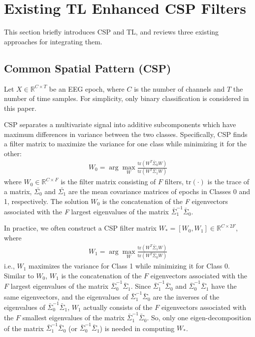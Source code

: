 \documentclass[runningheads]{llncs}
\begin{document}
\section{Existing TL Enhanced CSP Filters} \label{sect:bk}

This section briefly introduces CSP and TL, and reviews three existing approaches for integrating them.

\subsection{Common Spatial Pattern (CSP)}

Let $X\in \mathbb{R}^{C\times T}$ be an EEG epoch, where $C$ is the number of channels and $T$ the number of time samples. For simplicity, only binary classification is considered in this paper.

CSP \cite{drwuSF2018,Blankertz2008,Ramoser2000} separates a multivariate signal into additive subcomponents which have maximum differences in variance between the two classes. Specifically, CSP finds a filter matrix to maximize the variance for one class while minimizing it for the other:
\begin{align}
W_0=\arg \max_{W} \frac{\mathrm{tr}(W^T\bar{\Sigma}_0W)}{\mathrm{tr}(W^T \bar{\Sigma}_1W)} \label{1}
\end{align}
where $W_0\in \mathbb{R}^{C\times F}$ is the filter matrix consisting of $F$ filters, $\mathrm{tr}(\cdot)$ is the trace of a matrix, $\bar{\Sigma_0}$ and $ \bar{\Sigma_1}$ are the mean covariance matrices of epochs in Classes 0 and 1, respectively. The solution $W_0$ is the concatenation of the \textit{F} eigenvectors associated with the \textit{F} largest eigenvalues of the matrix $\bar{\Sigma}_1^{-1}\bar{\Sigma}_0$.

In practice, we often construct a CSP filter matrix $W_{\ast}=[W_0, W_1]\in \mathbb{R}^{C\times 2F}$, where
\begin{align}
W_1=\arg \max_W \frac{\mathrm{tr}(W^T\bar{\Sigma}_1W)}{\mathrm{tr}(W^T \bar{\Sigma}_0W)}\label{2}
\end{align}
i.e., $W_1$ maximizes the variance for Class 1 while minimizing it for Class 0. Similar to $W_0$, $W_1$ is the concatenation of the $F$ eigenvectors associated with the $F$ largest eigenvalues of the matrix $\bar{\Sigma}_0^{-1}\bar{\Sigma}_1$. Since $\bar{\Sigma}_1^{-1}\bar{\Sigma}_0$ and $\bar{\Sigma}_0^{-1}\bar{\Sigma}_1$ have the same eigenvectors, and the eigenvalues of $\bar{\Sigma}_1^{-1}\bar{\Sigma}_0$ are the inverses of the eigenvalues of $\bar{\Sigma}_0^{-1}\bar{\Sigma}_1$, $W_1$ actually consists of the $F$ eigenvectors associated with the $F$ smallest eigenvalues of the matrix $\bar{\Sigma}_1^{-1}\bar{\Sigma}_0$. So, only one eigen-decomposition of the matrix $\bar{\Sigma}_1^{-1}\bar{\Sigma}_0$ (or $\bar{\Sigma}_0^{-1}\bar{\Sigma}_1$) is needed in computing $W_{\ast}$.
\end{document}
